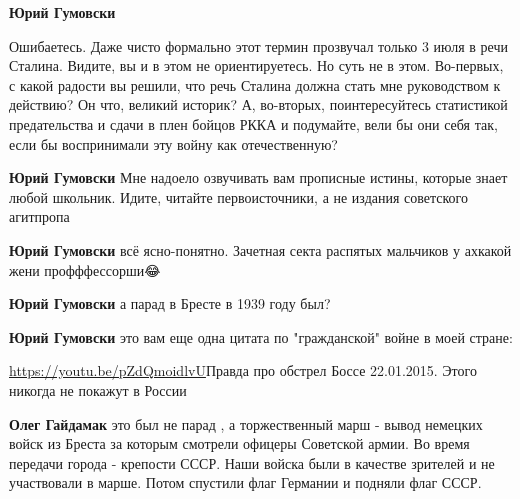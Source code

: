 \begin{itemize}
\begin{itemize}

\textbf{Юрий Гумовски} 

Ошибаетесь. Даже чисто формально этот термин прозвучал только 3 июля в речи
Сталина. Видите, вы и в этом не ориентируетесь. Но суть не в этом. Во-первых, с
какой радости вы решили, что речь Сталина должна стать мне руководством к
действию? Он что, великий историк? А, во-вторых, поинтересуйтесь статистикой
предательства и сдачи в плен бойцов РККА и подумайте, вели бы они себя так,
если бы воспринимали эту войну как отечественную?



\textbf{Юрий Гумовски} Мне надоело озвучивать вам прописные истины, которые
знает любой школьник. Идите, читайте первоисточники, а не издания советского
агитпропа


\textbf{Юрий Гумовски} всё ясно-понятно. Зачетная секта распятых мальчиков у ахкакой жени профффессорши😂


\textbf{Юрий Гумовски} а парад в Бресте в 1939 году был?


\textbf{Юрий Гумовски} это вам еще одна цитата по "гражданской" войне в моей стране:

\url{https://youtu.be/pZdQmoidlvU}{Правда про обстрел Боссе 22.01.2015. Этого никогда не покажут в России}


\textbf{Олег Гайдамак} это был не парад , а торжественный марш - вывод немецких войск из Бреста за которым смотрели офицеры Советской армии. Во время передачи города - крепости СССР. Наши войска были в качестве зрителей и не участвовали в марше. Потом спустили флаг Германии и подняли флаг СССР.


\end{itemize}
\end{itemize}
